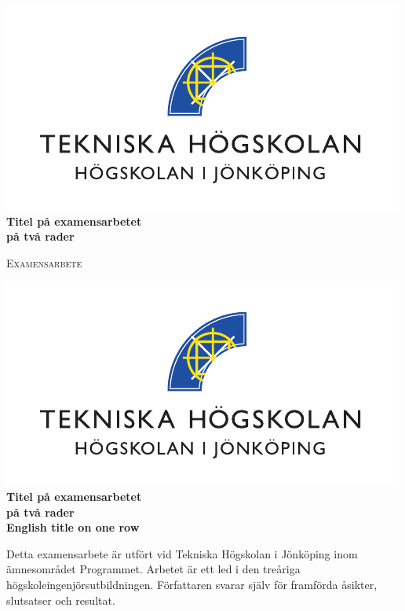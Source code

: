 \documentclass[12pt,a4paper]{article}
\newcommand{\blankpage}{
\newpage
\thispagestyle{empty}
\mbox{}
\newpage
}
\begin{document}
\pagestyle{empty}
\begin{center}


\includegraphics[width=12.2 cm]{Bilder/JTH_cmyk_B-eps-converted-to.pdf}
\vfill
\textbf{\LARGE  Titel på examensarbetet \\ på två rader}
\vfill
%
%

%
%
\vfill
\textsc{\Huge Examensarbete \the\year }\\[0.5cm]
%
%




\blankpage

\includegraphics[width=12.2 cm]{Bilder/JTH_cmyk_B-eps-converted-to.pdf}
\vfill
\textbf{\LARGE  Titel på examensarbetet \\ på två rader}\\[0.6cm]
%
%

\textbf{\large  English title on one row}
%
%
\vfill
{}
\end{center}
\vfill
%
%

\normalsize Detta examensarbete är utfört vid Tekniska Högskolan i Jönköping inom ämnesområdet
Programmet. Arbetet är ett led i den treåriga högskoleingenjörsutbildningen. Författaren svarar själv för framförda åsikter, slutsatser och resultat.\\[0.4cm]
\\[0.4cm]
\\[0.4cm]
\\[0.4cm]
\\[0.4cm]
\end{document}
